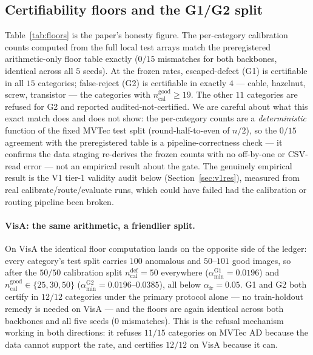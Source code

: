 \documentclass[preprint,11pt]{elsarticle}
\begin{document}
\subsection{Certifiability floors and the G1/G2 split}
\label{sec:floors}

Table~\ref{tab:floors} is the paper's honesty figure. The per-category calibration counts computed
from the full local test arrays match the preregistered arithmetic-only floor table exactly
($0/15$ mismatches for both backbones, identical across all $5$ seeds). At the frozen rates,
escaped-defect (G1) is certifiable in all $15$ categories; false-reject (G2) is certifiable
in exactly $4$ --- cable, hazelnut, screw, transistor --- the categories with
$n_{\text{cal}}^{\text{good}} \ge 19$. The other $11$ categories are refused for G2 and reported
audited-not-certified. We are careful about what this exact match does and does not show: the
per-category counts are a \emph{deterministic} function of the fixed MVTec test split
(round-half-to-even of $n/2$), so the $0/15$ agreement with the preregistered table is a
pipeline-correctness check --- it confirms the data staging re-derives the frozen counts with no
off-by-one or CSV-read error --- not an empirical result about the gate. The genuinely empirical
result is the V1 tier-1 validity audit below (Section~\ref{sec:v1res}), measured from real
calibrate/route/evaluate runs, which could have failed had the calibration or routing pipeline been
broken.

\FloatBarrier

\paragraph{VisA: the same arithmetic, a friendlier split.} On VisA the identical floor
computation lands on the opposite side of the ledger: every category's test split carries
$100$ anomalous and $50$--$101$ good images, so after the $50/50$ calibration split
$n_{\text{cal}}^{\text{def}} = 50$ everywhere ($\alpha_{\min}^{\text{G1}} = 0.0196$) and
$n_{\text{cal}}^{\text{good}} \in \{25, 30, 50\}$ ($\alpha_{\min}^{\text{G2}} =
0.0196$--$0.0385$), all below $\alpha_{\text{fr}} = 0.05$. G1 and G2 both certify in
$12/12$ categories under the primary protocol alone --- no train-holdout remedy is needed on
VisA --- and the floors are again identical across both backbones and all five seeds ($0$
mismatches). This is the refusal mechanism working in both directions: it refuses $11/15$
categories on MVTec AD because the data cannot support the rate, and certifies $12/12$ on VisA
because it can.
\end{document}
